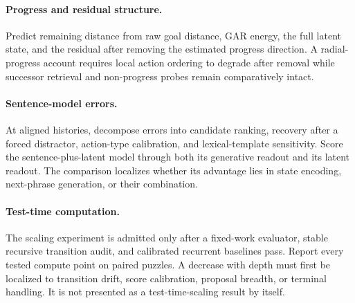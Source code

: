 \paragraph{Progress and residual structure.}
Predict remaining distance from raw goal distance, GAR energy, the full latent state, and the residual after removing the estimated progress direction. A radial-progress account requires local action ordering to degrade after removal while successor retrieval and non-progress probes remain comparatively intact.

\paragraph{Sentence-model errors.}
At aligned histories, decompose errors into candidate ranking, recovery after a forced distractor, action-type calibration, and lexical-template sensitivity. Score the sentence-plus-latent model through both its generative readout and its latent readout. The comparison localizes whether its advantage lies in state encoding, next-phrase generation, or their combination.

\paragraph{Test-time computation.}
The scaling experiment is admitted only after a fixed-work evaluator, stable recursive transition audit, and calibrated recurrent baselines pass. Report every tested compute point on paired puzzles. A decrease with depth must first be localized to transition drift, score calibration, proposal breadth, or terminal handling. It is not presented as a test-time-scaling result by itself.
